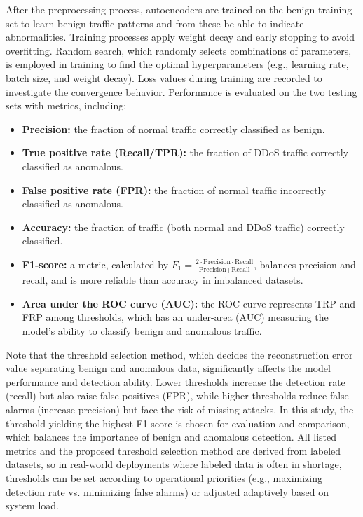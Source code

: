After the preprocessing process, autoencoders are trained on the benign training set to learn benign traffic patterns and from these be able to indicate abnormalities. Training processes apply weight decay and early stopping to avoid overfitting. Random search, which randomly selects combinations of parameters, is employed in training to find the optimal hyperparameters (e.g., learning rate, batch size, and weight decay). Loss values during training are recorded to investigate the convergence behavior. Performance is evaluated on the two testing sets with metrics, including:

\begin{itemize}
    \item \textbf{Precision:} the fraction of normal traffic correctly classified as benign.
    \item \textbf{True positive rate (Recall/TPR):} the fraction of DDoS traffic correctly classified as anomalous.
    \item \textbf{False positive rate (FPR):} the fraction of normal traffic incorrectly classified as anomalous.
    \item \textbf{Accuracy:} the fraction of traffic (both normal and DDoS traffic) correctly classified.
    \item \textbf{F1-score:} a metric, calculated by $F_{1} = \frac{2 \cdot \text{Precision} \cdot \text{Recall}}{\text{Precision} + \text{Recall}}$, balances precision and recall, and is more reliable than accuracy in imbalanced datasets.
    \item \textbf{Area under the ROC curve (AUC):} the ROC curve represents TRP and FRP among thresholds, which has an under-area (AUC) measuring the model’s ability to classify benign and anomalous traffic.
\end{itemize}

Note that the threshold selection method, which decides the reconstruction error value separating benign and anomalous data, significantly affects the model performance and detection ability. Lower thresholds increase the detection rate (recall) but also raise false positives (FPR), while higher thresholds reduce false alarms (increase precision) but face the risk of missing attacks. In this study, the threshold yielding the highest F1-score is chosen for evaluation and comparison, which balances the importance of benign and anomalous detection. All listed metrics and the proposed threshold selection method are derived from labeled datasets, so in real-world deployments where labeled data is often in shortage, thresholds can be set according to operational priorities (e.g., maximizing detection rate vs. minimizing false alarms) or adjusted adaptively based on system load. 

